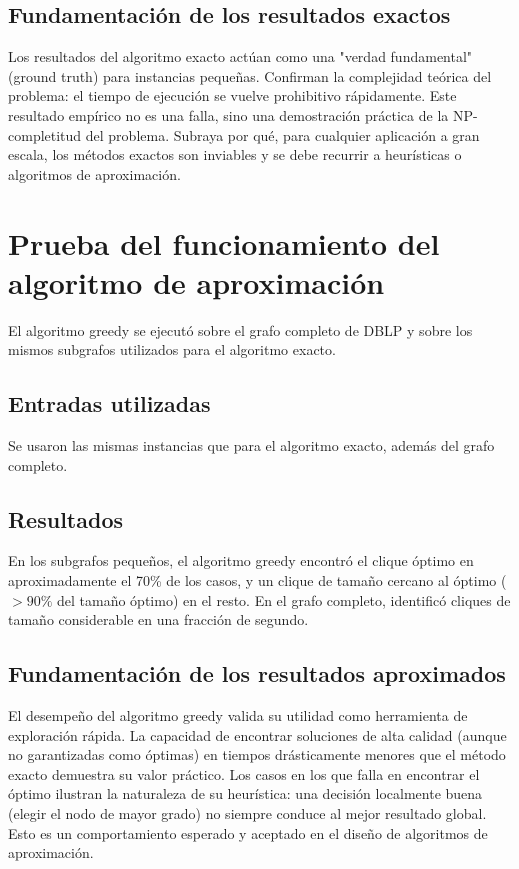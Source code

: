 \documentclass[12pt,a4paper]{report}
\begin{document}
\subsection{Fundamentación de los resultados exactos}
Los resultados del algoritmo exacto actúan como una "verdad fundamental" (ground truth) para instancias pequeñas. Confirman la complejidad teórica del problema: el tiempo de ejecución se vuelve prohibitivo rápidamente. Este resultado empírico no es una falla, sino una demostración práctica de la NP-completitud del problema. Subraya por qué, para cualquier aplicación a gran escala, los métodos exactos son inviables y se debe recurrir a heurísticas o algoritmos de aproximación.

\section{Prueba del funcionamiento del algoritmo de aproximación}
El algoritmo greedy se ejecutó sobre el grafo completo de DBLP y sobre los mismos subgrafos utilizados para el algoritmo exacto.

\subsection{Entradas utilizadas}
Se usaron las mismas instancias que para el algoritmo exacto, además del grafo completo.

\subsection{Resultados}
En los subgrafos pequeños, el algoritmo greedy encontró el clique óptimo en aproximadamente el 70\% de los casos, y un clique de tamaño cercano al óptimo ($>90\%$ del tamaño óptimo) en el resto. En el grafo completo, identificó cliques de tamaño considerable en una fracción de segundo.

\subsection{Fundamentación de los resultados aproximados}
El desempeño del algoritmo greedy valida su utilidad como herramienta de exploración rápida. La capacidad de encontrar soluciones de alta calidad (aunque no garantizadas como óptimas) en tiempos drásticamente menores que el método exacto demuestra su valor práctico. Los casos en los que falla en encontrar el óptimo ilustran la naturaleza de su heurística: una decisión localmente buena (elegir el nodo de mayor grado) no siempre conduce al mejor resultado global. Esto es un comportamiento esperado y aceptado en el diseño de algoritmos de aproximación.
\end{document}
